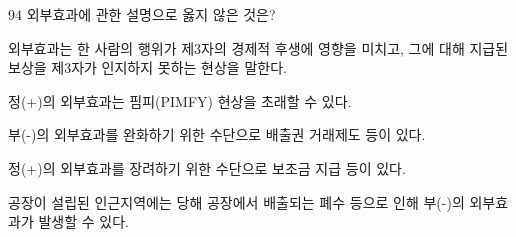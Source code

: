 \begin{question}{94}
외부효과에 관한 설명으로 옳지 않은 것은?
\begin{choices}
  \item 외부효과는 한 사람의 행위가 제3자의 경제적 후생에 영향을 미치고, 그에 대해 지급된 보상을 제3자가 인지하지 못하는 현상을 말한다.
  \item 정(+)의 외부효과는 핌피(PIMFY) 현상을 초래할 수 있다.
  \item 부(-)의 외부효과를 완화하기 위한 수단으로 배출권 거래제도 등이 있다.
  \item 정(+)의 외부효과를 장려하기 위한 수단으로 보조금 지급 등이 있다.
  \item 공장이 설립된 인근지역에는 당해 공장에서 배출되는 폐수 등으로 인해 부(-)의 외부효과가 발생할 수 있다.
\end{choices}
\end{question}
